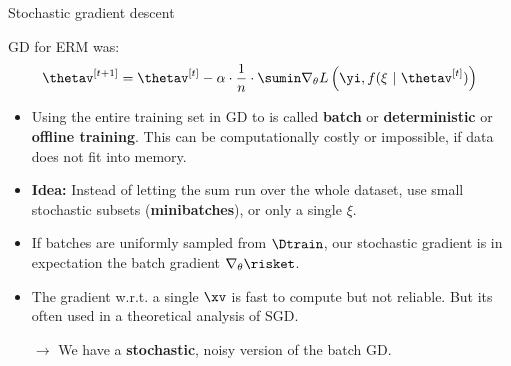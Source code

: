 \begin{vbframe}{Stochastic gradient descent}

GD for ERM was: 
$$
  \thetav^{[t + 1]} = \thetav^{[t]} - \alpha \cdot \frac{1}{n} \cdot \sumin \nabla_\theta L\left(\yi, f(\xi ~|~ \thetav^{[t]})\right)
$$
  \begin{itemize}
    \item Using the entire training set in GD to is called \textbf{batch} or \textbf{deterministic} or \textbf{offline training}. This can be computationally costly or impossible, if data does not fit into memory.
    \item \textbf{Idea:} Instead of letting the sum run over the whole dataset, use small stochastic subsets (\textbf{minibatches}), or only a single $\xi$. 
     \item If batches are uniformly sampled from $\Dtrain$, our stochastic gradient is in expectation the batch gradient $\nabla_\theta \risket$.
    \item The gradient w.r.t. a single $\xv$ is fast to compute but not reliable. But its often used in a theoretical analysis of SGD.
    \item[$\to$] We have a \textbf{stochastic}, noisy version of the batch GD.


  \end{itemize}
 

\end{vbframe}
